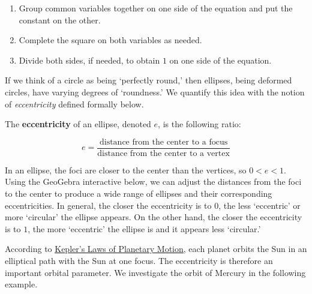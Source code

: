 \documentclass{ximera}
\begin{document}
\begin{enumerate}

\item  Group common variables together on one side of the equation and put the constant on the other.

\item  Complete the square on both variables as needed.

\item  Divide both sides, if needed,  to obtain $1$ on one side of the equation.

\end{enumerate}


 


If we think of a circle as being `perfectly round,' then ellipses, being deformed circles, have varying degrees of `roundness.'   We quantify this idea with the notion of \textit{eccentricity} defined formally below.

 


\begin{definition}

The \label{ellipseeccentricity}   \textbf{eccentricity} of an ellipse, denoted $e$, is the following ratio:

\[  e = \frac{\mbox{distance from the center to a focus}}{\mbox{distance from the center to a vertex}} \]

\end{definition}


 

In an ellipse, the foci are closer to the center than the vertices, so $0 < e < 1$. Using the GeoGebra interactive below, we can adjust the distances from the foci to the center to produce a wide range of ellipses and their corresponding eccentricities.   In general, the closer the eccentricity is to $0$, the less `eccentric' or more  `circular' the ellipse appears.   On the other hand, the closer the eccentricity is to $1$, the more `eccentric' the ellipse is and it appears less `circular.'

\begin{center}
\end{center}

According to \href{https://en.wikipedia.org/wiki/Kepler's_laws_of_planetary_motion}{\underline{Kepler's Laws of Planetary Motion}}, each planet orbits the Sun in an elliptical path  with the Sun at one focus.  The eccentricity is therefore an important orbital parameter.  We investigate the orbit of Mercury in the following example.
\end{document}
